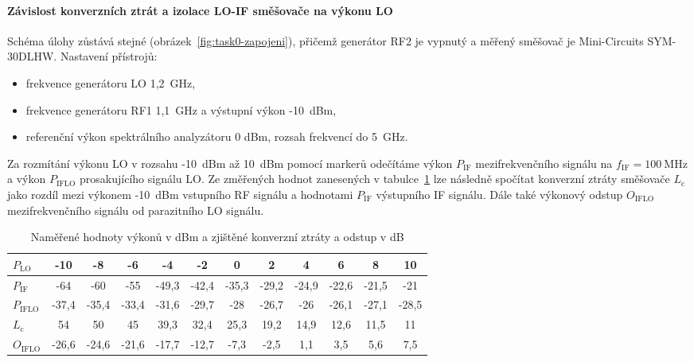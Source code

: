 \documentclass[11pt,a4paper]{article}
\begin{document}
\paragraph*{Závislost konverzních ztrát a izolace LO-IF směšovače na výkonu LO} Schéma úlohy zůstává stejné (obrázek~\ref{fig:task0-zapojeni}), přičemž generátor RF2 je vypnutý a měřený směšovač je Mini-Circuits SYM-30DLHW. Nastavení přístrojů:
\begin{itemize}
    \item frekvence generátoru LO 1,2~GHz,
    \item frekvence generátoru RF1 1,1~GHz a výstupní výkon -10~dBm,
    \item referenční výkon spektrálního analyzátoru 0 dBm, rozsah frekvencí do 5~GHz.
\end{itemize}
Za rozmítání výkonu LO v rozsahu -10~dBm až 10~dBm pomocí markerů odečítáme výkon $P_{\mathrm{IF}}$ mezifrekvenčního signálu na $f_{\mathrm{IF}} = 100 \ \mathrm{MHz}$ a výkon $P_{\mathrm{IFLO}}$ prosakujícího signálu LO. Ze změřených hodnot zanesených v tabulce~\ref{table:task1-data} lze následně spočítat konverzní ztráty směšovače $L_{\mathrm c}$ jako rozdíl mezi výkonem -10~dBm vstupního RF signálu a hodnotami $P_{\mathrm{IF}}$ výstupního IF signálu. Dále také výkonový odstup $O_{\mathrm{IFLO}}$ mezifrekvenčního signálu od parazitního LO signálu.
\begin{table}[!ht]
    \centering
    \begin{tabular}{| l || c | c | c | c | c | c | c | c | c | c | c |}
        \hline
        $P_{\mathrm{LO}}$ & -10 & -8 & -6 & -4 & -2 & 0 & 2 & 4 & 6 & 8 & 10\\
        \hline
        $P_{\mathrm{IF}}$ & -64 & -60 & -55 & -49,3 & -42,4 & -35,3 & -29,2 & -24,9 & -22,6 & -21,5 & -21\\
        \hline
        $P_{\mathrm{IFLO}}$ & -37,4 & -35,4 & -33,4 & -31,6 & -29,7 & -28 & -26,7 & -26 & -26,1 & -27,1 & -28,5\\
        \hline\hline
        $L_{\mathrm{c}}$ & 54 & 50 & 45 & 39,3 & 32,4 & 25,3 & 19,2 & 14,9 & 12,6 & 11,5 & 11\\
        \hline
        $O_{\mathrm{IFLO}}$ & -26,6 & -24,6 & -21,6 & -17,7 & -12,7 & -7,3 & -2,5 & 1,1 & 3,5 & 5,6 & 7,5\\
        \hline
    \end{tabular}
    \caption{Naměřené hodnoty výkonů v dBm a zjištěné konverzní ztráty a odstup v dB}
    \label{table:task1-data}
\end{table}
\end{document}
